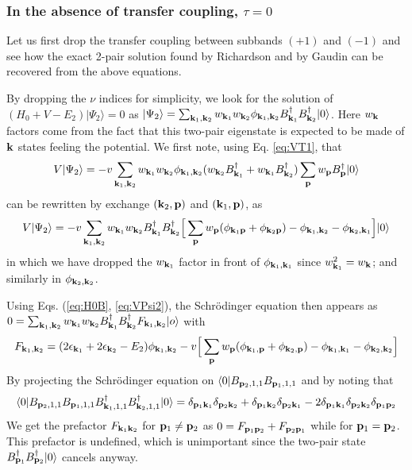 \documentclass[11pt]{article} %
\begin{document}
\subsubsection{In the absence of transfer coupling, $\tau=0$}
Let us first drop the transfer coupling between subbands $(+1)$ and $(-1)$ and see how the exact 2-pair solution found by Richardson \cite{Richardson1, Richardson2, Richardson3} and by Gaudin \cite{Gaudin} can be recovered from the above equations. 

By dropping the $\nu$ indices for simplicity, we look for the solution of $(H_0+V-E_2)|\Psi_2\rangle=0$ as $|\Psi_2\rangle=\sum_{\mathbf{k}_1,\mathbf{k}_2}w_{\mathbf{k}_1}w_{\mathbf{k}_2}\phi_{\mathbf{k}_1,\mathbf{k}_2}B^{\dagger}_{\mathbf{k}_1}B^{\dagger}_{\mathbf{k}_2}|0\rangle$.  Here $w_{\mathbf{k}}$ factors come from the fact that this two-pair eigenstate is expected to be made of $\mathbf{k}$ states feeling the potential.  We first note, using Eq. \ref{eq:VT1}, that
\begin{equation}
V|\Psi_2\rangle=
-v\sum_{\mathbf{k}_1,\mathbf{k}_2}w_{\mathbf{k}_1}w_{\mathbf{k}_2}\phi_{\mathbf{k}_1,\mathbf{k}_2}({w_{\mathbf{k}_2}}B^{\dagger}_{\mathbf{k}_1}+{w_{\mathbf{k}_1}}B^{\dagger}_{\mathbf{k}_2})\sum_{\mathbf{p}}w_{\mathbf{p}}B^{\dagger}_{\mathbf{p}}|0\rangle
\end{equation}
can be rewritten by exchange $(\mathbf{k}_2,\mathbf{p})$ and $(\mathbf{k}_1,\mathbf{p})$, as 
\begin{equation}\label{eq:VPsi2}
V|\Psi_2\rangle=-v\sum_{\mathbf{k}_1,\mathbf{k}_2}w_{\mathbf{k}_1}w_{\mathbf{k}_2}B^{\dagger}_{\mathbf{k}_1}B^{\dagger}_{\mathbf{k}_2}
\Big[\sum_{\mathbf{p}}w_{\mathbf{p}}(\phi_{\mathbf{k}_1\mathbf{p}}+\phi_{\mathbf{k}_2\mathbf{p}})-\phi_{\mathbf{k}_1,\mathbf{k}_2}-\phi_{\mathbf{k}_2,\mathbf{k}_1}\Big]|0\rangle
\end{equation}
in which we have dropped the $w_{\mathbf{k}_1}$ factor in front of $\phi_{\mathbf{k}_1,\mathbf{k}_1}$ since $w_{\mathbf{k}_1}^2=w_{\mathbf{k}}$; and similarly in $\phi_{\mathbf{k}_2,\mathbf{k}_2}$.

Using Eqs. (\ref{eq:H0B}, \ref{eq:VPsi2}), the Schr\"odinger equation then appears as $0=\sum_{\mathbf{k}_1,\mathbf{k}_2}w_{\mathbf{k}_1}w_{\mathbf{k}_2}B^{\dagger}_{\mathbf{k}_1}B^{\dagger}_{\mathbf{k}_2}F_{\mathbf{k}_1,\mathbf{k}_2}|o\rangle$ with
\begin{equation}
F_{\mathbf{k}_1,\mathbf{k}_2}=(2\epsilon_{\mathbf{k}_1}+2\epsilon_{\mathbf{k}_2}-E_2)\phi_{\mathbf{k}_1,\mathbf{k}_2}
-v\Big[\sum_{\mathbf{p}}w_{\mathbf{p}}(\phi_{\mathbf{k}_1,\mathbf{p}}+\phi_{\mathbf{k}_2,\mathbf{p}})-\phi_{\mathbf{k}_1,\mathbf{k}_1}-\phi_{\mathbf{k}_2,\mathbf{k}_2}\Big]
\end{equation}
By projecting the Schr\"odinger equation on $\langle0|B_{\mathbf{p}_2,1,1}B_{\mathbf{p}_1,1,1}$ and by noting that 
\begin{equation}
\langle0|B_{\mathbf{p}_2,1,1}B_{\mathbf{p}_1,1,1}B^{\dagger}_{\mathbf{k}_1,1,1}B^{\dagger}_{\mathbf{k}_2,1,1}|0\rangle
=\delta_{\mathbf{p}_1\mathbf{k}_1}\delta_{\mathbf{p}_2\mathbf{k}_2}+\delta_{\mathbf{p}_1\mathbf{k}_2}\delta_{\mathbf{p}_2\mathbf{k}_1}-2\delta_{\mathbf{p}_1\mathbf{k}_1}\delta_{\mathbf{p}_2\mathbf{k}_2}\delta_{\mathbf{p}_1\mathbf{p}_2}
\end{equation}
We get the prefactor $F_{\mathbf{k}_1\mathbf{k}_2}$ for $\mathbf{p}_1\neq\mathbf{p}_2$ as $0=F_{\mathbf{p}_1\mathbf{p}_2}+F_{\mathbf{p}_2\mathbf{p}_1}$ while for $\mathbf{p}_1=\mathbf{p}_2$. This prefactor is undefined, which is unimportant since the two-pair state $B^{\dagger}_{\mathbf{p}_1}B^{\dagger}_{\mathbf{p}_2}|0\rangle$ cancels anyway.  
\end{document}
